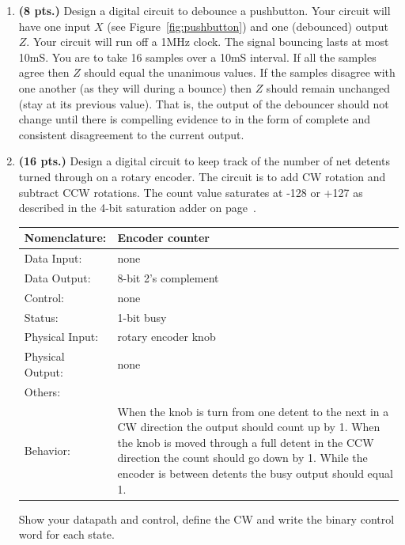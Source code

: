 \begin{enumerate}

\item {\bf (8 pts.)}
Design a digital circuit to debounce a pushbutton.  Your circuit
will have one input $X$ (see Figure~\ref{fig:pushbutton}) and
one (debounced) output $Z$. Your circuit will run off a 1MHz clock.  
The signal bouncing lasts at most 10mS.  You are to take 16 samples 
over a 10mS interval.  If all the samples agree then $Z$ should
equal the unanimous values.  If the samples disagree with one
another (as they will during a bounce) then $Z$ should remain
unchanged (stay at its previous value).  That is, the output of 
the debouncer should not change until there is compelling evidence to
in the form of complete and consistent disagreement to the current
output.

\item{\bf (16 pts.)} Design a digital circuit to keep track of the
number of net detents turned through on a rotary encoder.  The circuit
is to add CW rotation and subtract CCW rotations.  The count value
saturates at -128 or +127 as described in the 4-bit saturation
adder on page~\pageref{page:saturation}.

\begin{tabular}{|l|p{3.5in}|} \hline
Nomenclature:  & Encoder counter         \\ \hline
Data Input:    & none         \\ \hline
Data Output:   & 8-bit 2's complement   \\ \hline
Control:       & none           \\ \hline
Status:        & 1-bit busy                                   \\ \hline
Physical Input:& rotary encoder knob        \\ \hline
Physical Output:& none          \\ \hline
Others:        &            \\ \hline
Behavior:      & When the knob is turn from one detent to the next in
a CW direction the output should count up by 1.  When the knob is moved
through a full detent in the CCW direction the count should go down
by 1.  While the encoder is between detents the busy output
should equal 1. \\ \hline
\end{tabular}

Show your datapath and control, define the CW and write the binary control
word for each state.


\end{enumerate}
